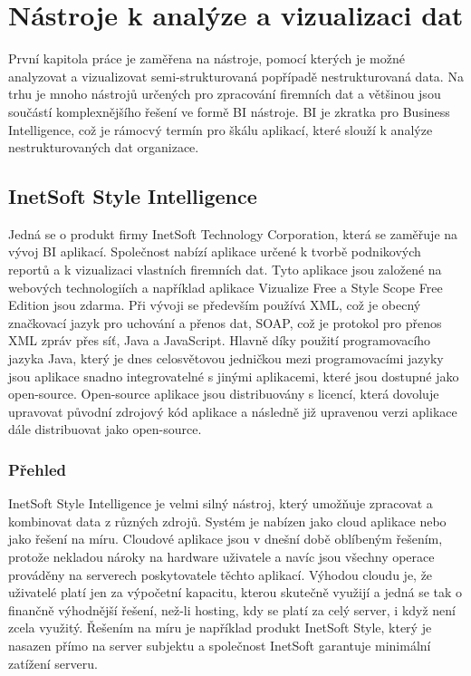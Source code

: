 \documentclass[czech,BP]{thesiskiv}
\begin{document}
\chapter{Nástroje k analýze a vizualizaci dat }

První kapitola práce je zaměřena na nástroje, pomocí kterých je možné analyzovat a vizualizovat semi-strukturovaná popřípadě nestrukturovaná data. Na trhu je mnoho nástrojů určených pro zpracování firemních dat a většinou jsou součástí komplexnějšího řešení ve formě BI nástroje. BI je zkratka pro Business Intelligence, což je rámocvý termín pro škálu aplikací, které slouží k analýze nestrukturovaných dat organizace.\cite{BI}

\section{InetSoft Style Intelligence}
Jedná se o produkt firmy InetSoft Technology Corporation, která  se zaměřuje na vývoj BI aplikací. Společnost nabízí aplikace určené k tvorbě podnikových reportů a k vizualizaci vlastních firemních dat. Tyto aplikace jsou založené na webových technologiích a například aplikace Vizualize Free a Style Scope Free Edition jsou zdarma. Při vývoji se především používá XML, což je obecný značkovací jazyk pro uchování a přenos dat, SOAP, což je protokol pro přenos XML zpráv přes síť, Java a JavaScript\cite{InetTechnology}. Hlavně díky použití programovacího jazyka Java, který je dnes celosvětovou jedničkou mezi programovacími jazyky \cite{JavaStandings} jsou aplikace snadno integrovatelné s jinými aplikacemi, které jsou dostupné jako open-source. Open-source aplikace jsou distribuovány s licencí, která dovoluje upravovat původní zdrojový kód aplikace a následně již upravenou verzi aplikace dále distribuovat jako open-source.

\subsection{Přehled}
InetSoft Style Intelligence je velmi silný nástroj, který umožňuje zpracovat a kombinovat data z různých zdrojů. Systém je nabízen jako cloud aplikace nebo jako řešení na míru. Cloudové aplikace jsou v dnešní době oblíbeným řešením, protože nekladou nároky na hardware uživatele a navíc jsou všechny operace prováděny na serverech poskytovatele těchto aplikací. Výhodou cloudu je, že uživatelé platí jen za výpočetní kapacitu, kterou skutečně využijí a jedná se tak o finančně výhodnější řešení, než-li hosting, kdy se platí za celý server, i když není zcela využitý. Řešením na míru je například produkt InetSoft Style, který je nasazen přímo na server subjektu a společnost InetSoft garantuje minimální zatížení serveru.
\end{document}
